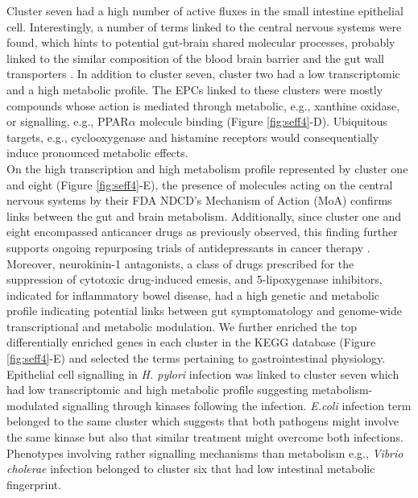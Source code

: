 Cluster seven had a high number of active fluxes in the small intestine epithelial cell. Interestingly, a number of terms linked to the central nervous systems were found, which hints to potential gut-brain shared molecular processes, probably linked to the similar composition of the blood brain barrier and the gut wall transporters \cite{banks2008blood}. In addition to cluster seven, cluster two had a low transcriptomic and a high metabolic profile. The EPCs linked to these clusters were mostly compounds whose action is mediated through metabolic, e.g., xanthine oxidase, or signalling, e.g., PPAR$\alpha$ molecule binding (Figure \ref{fig:seff4}-D). Ubiquitous targets, e.g., cyclooxygenase and histamine receptors would consequentially induce pronounced metabolic effects.\\
On the high transcription and high metabolism profile represented by cluster one and eight (Figure \ref{fig:seff4}-E), the presence of molecules acting on the central nervous systems by their FDA NDCD’s Mechanism of Action (MoA) confirms links between the gut and brain metabolism. Additionally, since cluster one and eight encompassed anticancer drugs as previously observed, this finding further supports ongoing repurposing trials of antidepressants in cancer therapy \cite{jahchan2013drug}. 
Moreover, neurokinin-1 antagonists, a class of drugs prescribed for the suppression of cytotoxic drug-induced emesis, and 5-lipoxygenase inhibitors, indicated for inflammatory bowel disease, had a high genetic and metabolic profile indicating potential links between gut symptomatology and genome-wide transcriptional and metabolic modulation. 
We further enriched the top differentially enriched genes in each cluster in the KEGG \cite{chen2013enrichr,kanehisa2017kegg} database (Figure \ref{fig:seff4}-E) and selected the terms pertaining to gastrointestinal physiology. Epithelial cell signalling in \textit{H. pylori} infection was linked to cluster seven which had low transcriptomic and high metabolic profile suggesting metabolism-modulated signalling through kinases following the infection. \textit{E.coli} infection term belonged to the same cluster which suggests that both pathogens might involve the same kinase but also that similar treatment might overcome both infections. Phenotypes involving rather signalling mechanisms than metabolism e.g., \textit{Vibrio cholerae} infection belonged to cluster six that had low intestinal metabolic fingerprint. \\
